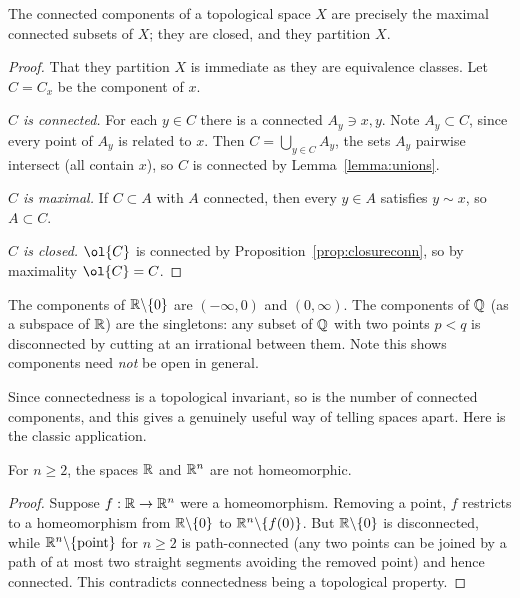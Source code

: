 \documentclass[a4paper]{scrartcl}
\begin{document}
\begin{proposition}
    The connected components of a topological space $X$ are precisely the maximal connected subsets of $X$; they are closed, and they partition $X$.
\end{proposition}
\begin{proof}
    That they partition $X$ is immediate as they are equivalence classes. Let $C = C_x$ be the component of $x$.

    \emph{$C$ is connected.} For each $y \in C$ there is a connected $A_y \ni x, y$. Note $A_y \subset C$, since every point of $A_y$ is related to $x$. Then $C = \bigcup_{y \in C} A_y$, the sets $A_y$ pairwise intersect (all contain $x$), so $C$ is connected by Lemma~\ref{lemma:unions}.

    \emph{$C$ is maximal.} If $C \subset A$ with $A$ connected, then every $y \in A$ satisfies $y \sim x$, so $A \subset C$.

    \emph{$C$ is closed.} $\ol{C}$ is connected by Proposition~\ref{prop:closureconn}, so by maximality $\ol{C} = C$.
\end{proof}

\begin{example}
    The components of $\mathbb{R} \backslash \{0\}$ are $(-\infty, 0)$ and $(0, \infty)$. The components of $\mathbb{Q}$ (as a subspace of $\mathbb{R}$) are the singletons: any subset of $\mathbb{Q}$ with two points $p < q$ is disconnected by cutting at an irrational between them. Note this shows components need \emph{not} be open in general.
\end{example}

Since connectedness is a topological invariant, so is the number of connected components, and this gives a genuinely useful way of telling spaces apart. Here is the classic application.

\begin{theorem}
    For $n \geq 2$, the spaces $\mathbb{R}$ and $\mathbb{R}^n$ are not homeomorphic.
\end{theorem}
\begin{proof}
    Suppose $f: \mathbb{R} \rightarrow \mathbb{R}^n$ were a homeomorphism. Removing a point, $f$ restricts to a homeomorphism from $\mathbb{R} \backslash \{0\}$ to $\mathbb{R}^n \backslash \{f(0)\}$. But $\mathbb{R} \backslash \{0\}$ is disconnected, while $\mathbb{R}^n \backslash \{\text{point}\}$ for $n \geq 2$ is path-connected (any two points can be joined by a path of at most two straight segments avoiding the removed point) and hence connected. This contradicts connectedness being a topological property.
\end{proof}
\end{document}
